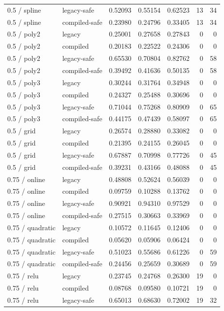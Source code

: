 \begin{longtable}{@{}llrrrrr@{}}
0.5 / spline & legacy-safe & 0.52093 & 0.55154 & 0.62523 & 13 & 34\\
0.5 / spline & compiled-safe & 0.23980 & 0.24796 & 0.33405 & 13 & 34\\
0.5 / poly2 & legacy & 0.25001 & 0.27658 & 0.27843 & 0 & 0\\
0.5 / poly2 & compiled & 0.20183 & 0.22522 & 0.24306 & 0 & 0\\
0.5 / poly2 & legacy-safe & 0.65530 & 0.70804 & 0.82762 & 0 & 58\\
0.5 / poly2 & compiled-safe & 0.39492 & 0.41636 & 0.50135 & 0 & 58\\
0.5 / poly3 & legacy & 0.30244 & 0.31764 & 0.34948 & 0 & 0\\
0.5 / poly3 & compiled & 0.24327 & 0.25488 & 0.30696 & 0 & 0\\
0.5 / poly3 & legacy-safe & 0.71044 & 0.75268 & 0.80909 & 0 & 65\\
0.5 / poly3 & compiled-safe & 0.44175 & 0.47439 & 0.58097 & 0 & 65\\
0.5 / grid & legacy & 0.26574 & 0.28880 & 0.33082 & 0 & 0\\
0.5 / grid & compiled & 0.21395 & 0.24155 & 0.26045 & 0 & 0\\
0.5 / grid & legacy-safe & 0.67887 & 0.70998 & 0.77726 & 0 & 45\\
0.5 / grid & compiled-safe & 0.39231 & 0.43166 & 0.48088 & 0 & 45\\
0.75 / online & legacy & 0.48808 & 0.52624 & 0.56039 & 0 & 0\\
0.75 / online & compiled & 0.09759 & 0.10288 & 0.13762 & 0 & 0\\
0.75 / online & legacy-safe & 0.90921 & 0.94310 & 0.97529 & 0 & 0\\
0.75 / online & compiled-safe & 0.27515 & 0.30663 & 0.33969 & 0 & 0\\
0.75 / quadratic & legacy & 0.10572 & 0.11645 & 0.12406 & 0 & 0\\
0.75 / quadratic & compiled & 0.05620 & 0.05906 & 0.06424 & 0 & 0\\
0.75 / quadratic & legacy-safe & 0.51023 & 0.55686 & 0.61226 & 0 & 59\\
0.75 / quadratic & compiled-safe & 0.24456 & 0.25659 & 0.30689 & 0 & 59\\
0.75 / relu & legacy & 0.23745 & 0.24768 & 0.26300 & 19 & 0\\
0.75 / relu & compiled & 0.08768 & 0.09580 & 0.10721 & 19 & 0\\
0.75 / relu & legacy-safe & 0.65013 & 0.68630 & 0.72002 & 19 & 32\\

\end{longtable}
